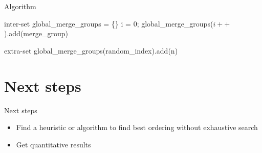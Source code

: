 \documentclass{beamer}
\begin{document}
\begin{frame}[fragile]{Algorithm}
 \small
 \scriptsize
\begin{algorithmic}[1]
    \LineComment inter-set
    \State global\_merge\_groups = \{\}
        \State i = 0;
            \State global\_merge\_groups($i++$).add(merge\_group)
        \EndFor
    \EndFor
    
    \LineComment extra-set
        \State global\_merge\_groups(random\_index).add(n)
    \EndFor
\end{algorithmic}
\end{frame}

\section{Next steps}
\begin{frame}{Next steps}
\begin{itemize}
    \item Find a heuristic or algorithm to find best ordering without exhaustive search
    \item Get quantitative results
\end{itemize}
\end{frame}
\end{document}
